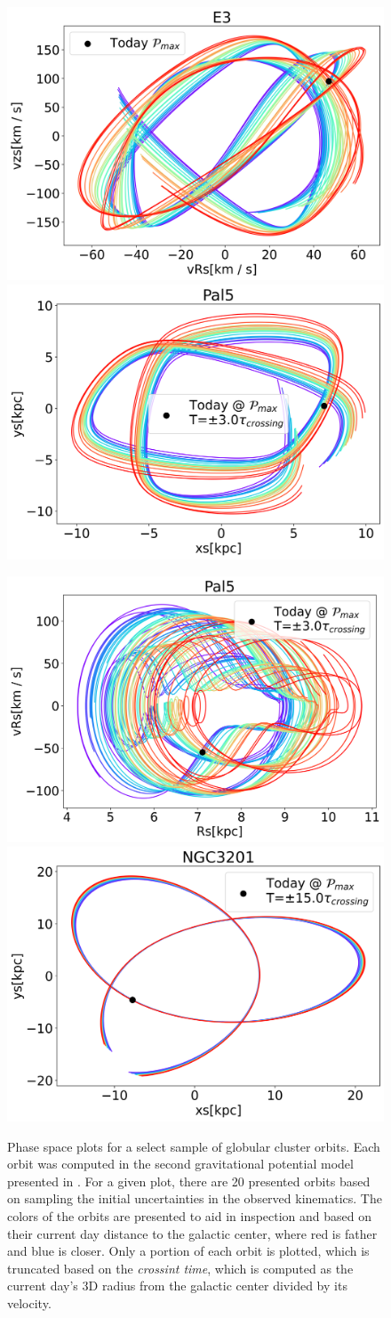 \begin{figure}
    \centering
    \includegraphics[width=0.45\linewidth]{images/E3_pouliasis2017pii_vRs_vzs.png}
    \includegraphics[width=0.45\linewidth]{images/Pal5_pouliasis2017pii_xs_ys.png}

    \includegraphics[width=0.45\linewidth]{images/Pal5_pouliasis2017pii_Rs_vRs.png}
    \includegraphics[width=0.45\linewidth]{images/NGC3201_pouliasis2017pii_xs_ys.png}
    \caption{Phase space plots for a select sample of globular cluster orbits. Each orbit was computed in the second gravitational potential model presented in \citet{2017A&A...598A..66P}. For a given plot, there are 20 presented orbits based on sampling the initial uncertainties in the observed kinematics. The colors of the orbits are presented to aid in inspection and based on their current day distance to the galactic center, where red is father and blue is closer. Only a portion of each orbit is plotted, which is truncated based on the \textit{crossint time}, which is computed as the current day's 3D radius from the galactic center divided by its velocity.  }
    \label{fig:orbit-uncertainties}
\end{figure}

